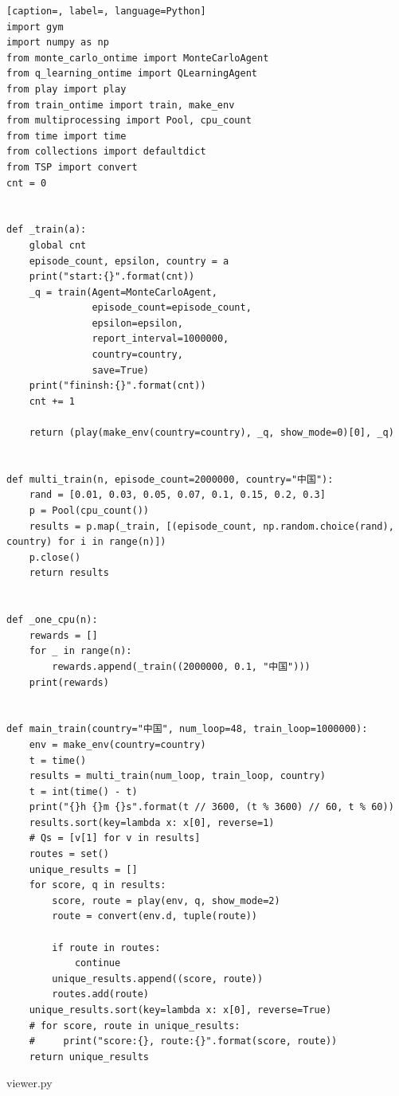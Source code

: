 \documentclass[a4paper,12pt]{jsreport}
\theoremstyle{definition}
\begin{document}
\begin{lstlisting}[caption=, label=, language=Python]
import gym
import numpy as np
from monte_carlo_ontime import MonteCarloAgent
from q_learning_ontime import QLearningAgent
from play import play
from train_ontime import train, make_env
from multiprocessing import Pool, cpu_count
from time import time
from collections import defaultdict
from TSP import convert
cnt = 0


def _train(a):
    global cnt
    episode_count, epsilon, country = a
    print("start:{}".format(cnt))
    _q = train(Agent=MonteCarloAgent,
               episode_count=episode_count,
               epsilon=epsilon,
               report_interval=1000000,
               country=country,
               save=True)
    print("fininsh:{}".format(cnt))
    cnt += 1

    return (play(make_env(country=country), _q, show_mode=0)[0], _q)


def multi_train(n, episode_count=2000000, country="中国"):
    rand = [0.01, 0.03, 0.05, 0.07, 0.1, 0.15, 0.2, 0.3]
    p = Pool(cpu_count())
    results = p.map(_train, [(episode_count, np.random.choice(rand), country) for i in range(n)])
    p.close()
    return results


def _one_cpu(n):
    rewards = []
    for _ in range(n):
        rewards.append(_train((2000000, 0.1, "中国")))
    print(rewards)


def main_train(country="中国", num_loop=48, train_loop=1000000):
    env = make_env(country=country)
    t = time()
    results = multi_train(num_loop, train_loop, country)
    t = int(time() - t)
    print("{}h {}m {}s".format(t // 3600, (t % 3600) // 60, t % 60))
    results.sort(key=lambda x: x[0], reverse=1)
    # Qs = [v[1] for v in results]
    routes = set()
    unique_results = []
    for score, q in results:
        score, route = play(env, q, show_mode=2)
        route = convert(env.d, tuple(route))

        if route in routes:
            continue
        unique_results.append((score, route))
        routes.add(route)
    unique_results.sort(key=lambda x: x[0], reverse=True)
    # for score, route in unique_results:
    #     print("score:{}, route:{}".format(score, route))
    return unique_results
\end{lstlisting}
viewer.py
\end{document}
